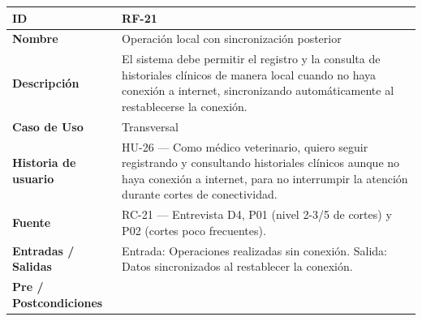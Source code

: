 \documentclass[
]{article}
\newcounter{none} %
\begin{document}
{\def\LTcaptype{none} %
\begin{longtable}[]{|
  >{\raggedright\arraybackslash}p{}|
  >{\raggedright\arraybackslash}p{}|}
\hline
\begin{minipage}[b]{\linewidth}\raggedright
\textbf{ID}
\end{minipage} & \begin{minipage}[b]{\linewidth}\raggedright
RF-21
\end{minipage} \\
\hline
\endhead
\hline
\endlastfoot
\textbf{Nombre} & \begin{minipage}[t]{\linewidth}\raggedright
Operación local con sincronización posterior
\end{minipage} \\
\hline
\textbf{Descripción} & \begin{minipage}[t]{\linewidth}\raggedright
El sistema debe permitir el registro y la consulta de historiales clínicos de manera local cuando no haya conexión a internet, sincronizando automáticamente al restablecerse la conexión.
\end{minipage} \\
\hline
\textbf{Caso de Uso} & \begin{minipage}[t]{\linewidth}\raggedright
Transversal
\end{minipage} \\
\hline
\textbf{Historia de usuario} & \begin{minipage}[t]{\linewidth}\raggedright
HU-26 — Como médico veterinario, quiero seguir registrando y consultando historiales clínicos aunque no haya conexión a internet, para no interrumpir la atención durante cortes de conectividad.
\end{minipage} \\
\hline
\textbf{Fuente} & \begin{minipage}[t]{\linewidth}\raggedright
RC-21 — Entrevista D4, P01 (nivel 2-3/5 de cortes) y P02 (cortes poco frecuentes).
\end{minipage} \\
\hline
\textbf{Entradas / Salidas} & \begin{minipage}[t]{\linewidth}\raggedright
Entrada: Operaciones realizadas sin conexión. Salida: Datos sincronizados al restablecer la conexión.
\end{minipage} \\
\hline
\textbf{Pre / Postcondiciones} & \begin{minipage}[t]{\linewidth}\raggedright

\end{minipage}
\end{longtable}}
\end{document}
